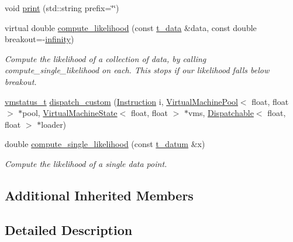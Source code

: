 \begin{DoxyCompactItemize}
void \hyperlink{class_my_hypothesis_a682dcd62d83189eae855d6aa4a40b0e0}{print} (std\+::string prefix=\char`\"{}\char`\"{})
\item 
virtual double \hyperlink{class_my_hypothesis_a85348639689176eaf456aaadd63cef2f}{compute\+\_\+likelihood} (const \hyperlink{class_bayesable_a70a593a67c7d43239ecc06bb4fd06a6b}{t\+\_\+data} \&data, const double breakout=-\/\hyperlink{_numerics_8h_a1bb1e42ae1b40cad6e99da0aab8a5576}{infinity})
\begin{DoxyCompactList}\small\item\em Compute the likelihood of a collection of data, by calling compute\+\_\+single\+\_\+likelihood on each. This stops if our likelihood falls below breakout. \end{DoxyCompactList}\item 
\hyperlink{_instruction_8h_a6202215407ab29590bb936ca2996cf64}{vmstatus\+\_\+t} \hyperlink{class_my_hypothesis_a3de47a545e8824bb8c63181965c62a01}{dispatch\+\_\+custom} (\hyperlink{class_instruction}{Instruction} i, \hyperlink{class_virtual_machine_pool}{Virtual\+Machine\+Pool}$<$ float, float $>$ $\ast$pool, \hyperlink{class_virtual_machine_state}{Virtual\+Machine\+State}$<$ float, float $>$ $\ast$vms, \hyperlink{class_dispatchable}{Dispatchable}$<$ float, float $>$ $\ast$loader)
\item 
double \hyperlink{class_my_hypothesis_a5e6bd5e0ebcb987aa4f0adf4295dba11}{compute\+\_\+single\+\_\+likelihood} (const \hyperlink{class_bayesable_a7c93a2eeab708378eb321745908718d4}{t\+\_\+datum} \&x)
\begin{DoxyCompactList}\small\item\em Compute the likelihood of a single data point. \end{DoxyCompactList}\end{DoxyCompactItemize}
\subsection*{Additional Inherited Members}


\subsection{Detailed Description}

